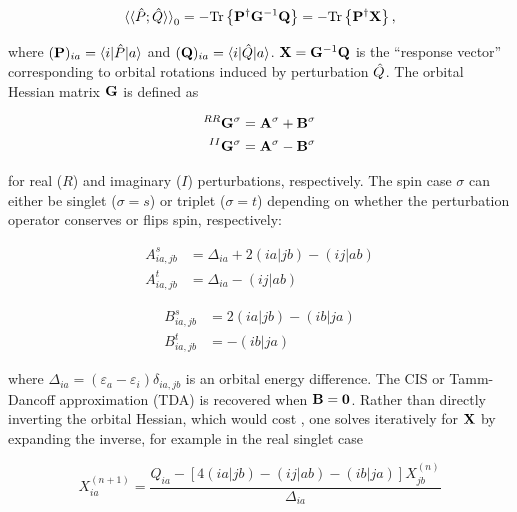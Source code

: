 \begin{equation}
  \braket{\braket{\hat{P}; \hat{Q}}}_{0}
  =
  - {\mathrm{Tr}}\left\{\mathbf{P}^{\dagger} \mathbf{G}^{-1} \mathbf{Q}\right\}
  =
  - {\mathrm{Tr}}\left\{\mathbf{P}^{\dagger} \mathbf{X}\right\},
\end{equation}

where \((\mathbf{P})_{ia} = \braket{i|\hat{P}|a}\) and \((\mathbf{Q})_{ia} = \braket{i|\hat{Q}|a}\). \(\mathbf{X} = \mathbf{G}^{-1} \mathbf{Q}\) is the ``response vector'' corresponding to orbital rotations induced by perturbation \(\hat{Q}\). The orbital Hessian matrix \(\mathbf{G}\) is defined as

\begin{equation}
  \begin{aligned}
    ^{RR}\mathbf{G}^{\sigma} &= \mathbf{A}^{\sigma} + \mathbf{B}^{\sigma} \\
    ^{II}\mathbf{G}^{\sigma} &= \mathbf{A}^{\sigma} - \mathbf{B}^{\sigma}
  \end{aligned}
\end{equation}

for real (\(R\)) and imaginary (\(I\)) perturbations, respectively\cite{doi:10.1080/00268976.2015.1024182}. The spin case \(\sigma\) can either be singlet (\(\sigma = s\)) or triplet (\(\sigma = t\)) depending on whether the perturbation operator conserves or flips spin, respectively:

\begin{equation}
  \begin{aligned}
    A^{s}_{ia,jb} &= \Delta_{ia} + 2(ia|jb) - (ij|ab) \\
    A^{t}_{ia,jb} &= \Delta_{ia} - (ij|ab)
  \end{aligned}
\end{equation}

\begin{equation}
  \begin{aligned}
    B^{s}_{ia,jb} &= 2(ia|jb) - (ib|ja) \\
    B^{t}_{ia,jb} &= - (ib|ja)
  \end{aligned}
\end{equation}

where \(\Delta_{ia} = (\varepsilon_{a} - \varepsilon_{i}) \delta_{ia,jb}\) is an orbital energy difference. The CIS or Tamm-Dancoff approximation (TDA) is recovered when \(\mathbf{B} = \mathbf{0}\). Rather than directly inverting the orbital Hessian, which would cost , one solves iteratively for \(\mathbf{X}\) by expanding the inverse, for example in the real singlet case

\begin{equation}
  \label{eq:update}
  X_{ia}^{(n+1)}
  =
  \frac{Q_{ia} - \left[4(ia|jb) - (ij|ab) - (ib|ja)\right] X_{jb}^{(n)}}
       {\Delta_{ia}}
\end{equation}

